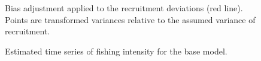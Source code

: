 \documentclass[
]{scrartcl}
\begin{document}
\begin{figure}[H]


\caption{\label{fig-biasramp}Bias adjustment applied to the recruitment
deviations (red line). Points are transformed variances relative to the
assumed variance of recruitment.}

\end{figure}%

\begin{figure}[H]


\caption{\label{fig-spr}Estimated time series of fishing intensity for
the base model.}

\end{figure}%
\end{document}

